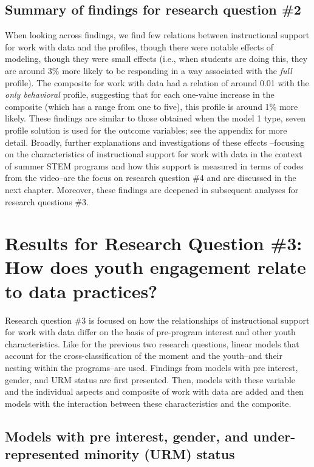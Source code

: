 \documentclass[]{msu-thesis}
\theoremstyle{definition}
\theoremstyle{definition}
\theoremstyle{definition}
\theoremstyle{remark}
\begin{document}
\subsection{Summary of findings for research question
\#2}\label{summary-of-findings-for-research-question-2}

When looking across findings, we find few relations between
instructional support for work with data and the profiles, though there
were notable effects of modeling, though they were small effects (i.e.,
when students are doing this, they are around 3\% more likely to be
responding in a way associated with the \emph{full} profile). The
composite for work with data had a relation of around 0.01 with the
\emph{only behavioral} profile, suggesting that for each one-value
increase in the composite (which has a range from one to five), this
profile is around 1\% more likely. These findings are similar to those
obtained when the model 1 type, seven profile solution is used for the
outcome variables; see the appendix for more detail. Broadly, further
explanations and investigations of these effects --focusing on the
characteristics of instructional support for work with data in the
context of summer STEM programs and how this support is measured in
terms of codes from the video--are the focus on research question \#4
and are discussed in the next chapter. Moreover, these findings are
deepened in subsequent analyses for research questions \#3.

\section{Results for Research Question \#3: How does youth engagement
relate to data
practices?}\label{results-for-research-question-3-how-does-youth-engagement-relate-to-data-practices}

Research question \#3 is focused on how the relationships of
instructional support for work with data differ on the basis of
pre-program interest and other youth characteristics. Like for the
previous two research questions, linear models that account for the
cross-classification of the moment and the youth--and their nesting
within the programs--are used. Findings from models with pre interest,
gender, and URM status are first presented. Then, models with these
variable and the individual aspects and composite of work with data are
added and then models with the interaction between these characteristics
and the composite.

\subsection{Models with pre interest, gender, and under-represented
minority (URM)
status}\label{models-with-pre-interest-gender-and-under-represented-minority-urm-status}
\end{document}
